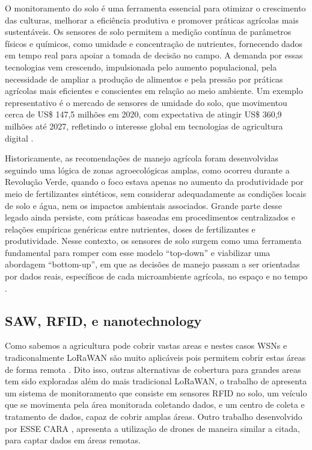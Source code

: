 \documentclass[conference]{IEEEtran}
\begin{document}
O monitoramento do solo é uma ferramenta essencial para otimizar o crescimento das culturas, melhorar a eficiência produtiva e promover práticas agrícolas mais sustentáveis. Os sensores de solo permitem a medição contínua de parâmetros físicos e químicos, como umidade e concentração de nutrientes, fornecendo dados em tempo real para apoiar a tomada de decisão no campo. A demanda por essas tecnologias vem crescendo, impulsionada pelo aumento populacional, pela necessidade de ampliar a produção de alimentos e pela pressão por práticas agrícolas mais eficientes e conscientes em relação ao meio ambiente. Um exemplo representativo é o mercado de sensores de umidade do solo, que movimentou cerca de US\$ 147{,}5 milhões em 2020, com expectativa de atingir US\$ 360{,}9 milhões até 2027, refletindo o interesse global em tecnologias de agricultura digital \cite{yin_2021_smart} .

Historicamente, as recomendações de manejo agrícola foram desenvolvidas seguindo uma lógica de zonas agroecológicas amplas, como ocorreu durante a Revolução Verde, quando o foco estava apenas no aumento da produtividade por meio de fertilizantes sintéticos, sem considerar adequadamente as condições locais de solo e água, nem os impactos ambientais associados. Grande parte desse legado ainda persiste, com práticas baseadas em procedimentos centralizados e relações empíricas genéricas entre nutrientes, doses de fertilizantes e produtividade. Nesse contexto, os sensores de solo surgem como uma ferramenta fundamental para romper com esse modelo “top-down” e viabilizar uma abordagem “bottom-up”, em que as decisões de manejo passam a ser orientadas por dados reais, específicos de cada microambiente agrícola, no espaço e no tempo \cite{viscarrarossel_2016_soil}.

\subsection{SAW, RFID, e nanotechnology}
Como sabemos a agricultura pode cobrir vastas areas e nestes casos WSNs e tradiconalmente LoRaWAN são muito aplicáveis pois permitem cobrir estas áreas de forma remota \textcite{deng_2020_novel}. Dito isso, outras alternativas de cobertura para grandes areas tem sido exploradas além do mais tradicional LoRaWAN, o trabalho de \textcite{deng_2020_novel} apresenta um sistema de monitoramento que consiste em sensores RFID no solo, um veículo que se movimenta pela área monitorada coletando dados, e um centro de coleta e tratamento de dados, capaz de cobrir amplas áreas. Outro trabalho desenvolvido por ESSE CARA \textcite{akhileshnagpure_2022_water}, apresenta a utilização de drones de maneira similar a citada, para captar dados em áreas remotas.
\end{document}
